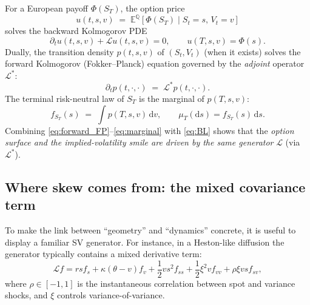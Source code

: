 \documentclass[11pt,a4paper]{report}
\begin{document}
For a European payoff $\Phi(S_T)$, the option price
\begin{equation}
u(t,s,v) \;=\; \mathbb{E}^{\mathbb{Q}}\!\left[\Phi(S_T)\mid S_t=s,\,V_t=v\right]
\end{equation}
solves the backward Kolmogorov PDE
\begin{equation}
\partial_t u(t,s,v) + \mathcal{L}u(t,s,v)=0,
\qquad
u(T,s,v)=\Phi(s).
\label{eq:backward}
\end{equation}
Dually, the transition density $p(t,s,v)$ of $(S_t,V_t)$ (when it exists) solves the forward Kolmogorov (Fokker--Planck) equation governed by the \emph{adjoint} operator $\mathcal{L}^\ast$:
\begin{equation}
\partial_t p(t,\cdot,\cdot) \;=\; \mathcal{L}^\ast p(t,\cdot,\cdot).
\label{eq:forward_FP}
\end{equation}
The terminal risk-neutral law of $S_T$ is the marginal of $p(T,s,v)$:
\begin{equation}
f_{S_T}(s) \;=\; \int p(T,s,v)\,\mathrm{d}v,
\qquad
\mu_T(\mathrm{d}s)=f_{S_T}(s)\,\mathrm{d}s.
\label{eq:marginal}
\end{equation}
Combining \eqref{eq:forward_FP}--\eqref{eq:marginal} with \eqref{eq:BL} shows that the \emph{option surface and the implied-volatility smile are driven by the same generator} $\mathcal{L}$ (via $\mathcal{L}^\ast$).

\subsection{Where skew comes from: the mixed covariance term}
To make the link between ``geometry'' and ``dynamics'' concrete, it is useful to display a familiar SV generator.
For instance, in a Heston-like diffusion the generator typically contains a mixed derivative term:
\begin{equation}
\mathcal{L}f
=
r s f_s + \kappa(\theta-v)f_v
+\frac{1}{2} v s^2 f_{ss}
+\frac{1}{2}\xi^2 v f_{vv}
+\rho \xi v s f_{sv},
\label{eq:heston_like_generator}
\end{equation}
where $\rho\in[-1,1]$ is the instantaneous correlation between spot and variance shocks, and $\xi$ controls variance-of-variance.
\end{document}

